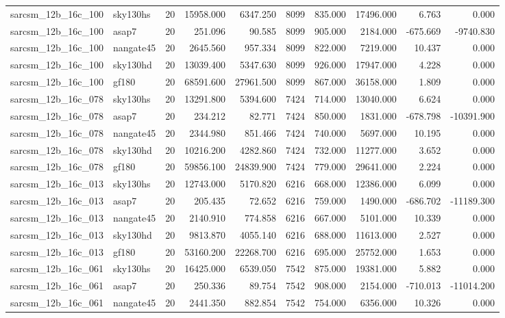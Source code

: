 \documentclass{article}
\begin{document}
\begin{longtable}{llrrrrrrrr}
sarcsm\_12b\_16c\_100 & sky130hs & 20 & 15958.000 & 6347.250 & 8099 & 835.000 & 17496.000 & 6.763 & 0.000 \\
sarcsm\_12b\_16c\_100 & asap7 & 20 & 251.096 & 90.585 & 8099 & 905.000 & 2184.000 & -675.669 & -9740.830 \\
sarcsm\_12b\_16c\_100 & nangate45 & 20 & 2645.560 & 957.334 & 8099 & 822.000 & 7219.000 & 10.437 & 0.000 \\
sarcsm\_12b\_16c\_100 & sky130hd & 20 & 13039.400 & 5347.630 & 8099 & 926.000 & 17947.000 & 4.228 & 0.000 \\
sarcsm\_12b\_16c\_100 & gf180 & 20 & 68591.600 & 27961.500 & 8099 & 867.000 & 36158.000 & 1.809 & 0.000 \\
sarcsm\_12b\_16c\_078 & sky130hs & 20 & 13291.800 & 5394.600 & 7424 & 714.000 & 13040.000 & 6.624 & 0.000 \\
sarcsm\_12b\_16c\_078 & asap7 & 20 & 234.212 & 82.771 & 7424 & 850.000 & 1831.000 & -678.798 & -10391.900 \\
sarcsm\_12b\_16c\_078 & nangate45 & 20 & 2344.980 & 851.466 & 7424 & 740.000 & 5697.000 & 10.195 & 0.000 \\
sarcsm\_12b\_16c\_078 & sky130hd & 20 & 10216.200 & 4282.860 & 7424 & 732.000 & 11277.000 & 3.652 & 0.000 \\
sarcsm\_12b\_16c\_078 & gf180 & 20 & 59856.100 & 24839.900 & 7424 & 779.000 & 29641.000 & 2.224 & 0.000 \\
sarcsm\_12b\_16c\_013 & sky130hs & 20 & 12743.000 & 5170.820 & 6216 & 668.000 & 12386.000 & 6.099 & 0.000 \\
sarcsm\_12b\_16c\_013 & asap7 & 20 & 205.435 & 72.652 & 6216 & 759.000 & 1490.000 & -686.702 & -11189.300 \\
sarcsm\_12b\_16c\_013 & nangate45 & 20 & 2140.910 & 774.858 & 6216 & 667.000 & 5101.000 & 10.339 & 0.000 \\
sarcsm\_12b\_16c\_013 & sky130hd & 20 & 9813.870 & 4055.140 & 6216 & 688.000 & 11613.000 & 2.527 & 0.000 \\
sarcsm\_12b\_16c\_013 & gf180 & 20 & 53160.200 & 22268.700 & 6216 & 695.000 & 25752.000 & 1.653 & 0.000 \\
sarcsm\_12b\_16c\_061 & sky130hs & 20 & 16425.000 & 6539.050 & 7542 & 875.000 & 19381.000 & 5.882 & 0.000 \\
sarcsm\_12b\_16c\_061 & asap7 & 20 & 250.336 & 89.754 & 7542 & 908.000 & 2154.000 & -710.013 & -11014.200 \\
sarcsm\_12b\_16c\_061 & nangate45 & 20 & 2441.350 & 882.854 & 7542 & 754.000 & 6356.000 & 10.326 & 0.000 \\

\end{longtable}
\end{document}

